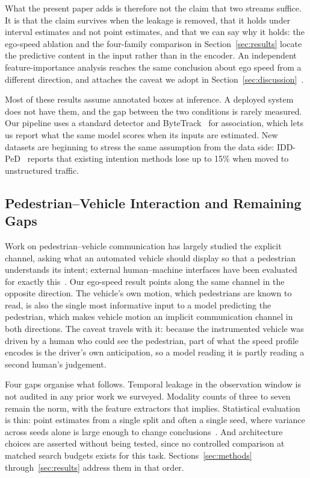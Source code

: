 \documentclass[mti,article,submit,moreauthors]{Definitions/mdpi}
\begin{document}
What the present paper adds is therefore not the claim that two streams suffice. It is that the claim survives when the leakage is removed, that it holds under interval estimates and not point estimates, and that we can say why it holds: the ego-speed ablation and the four-family comparison in Section~\ref{sec:results} locate the predictive content in the input rather than in the encoder. An independent feature-importance analysis reaches the same conclusion about ego speed from a different direction, and attaches the caveat we adopt in Section~\ref{sec:discussion}~\citep{azarmi2024featureimportance}.

Most of these results assume annotated boxes at inference. A deployed system does not have them, and the gap between the two conditions is rarely measured. Our pipeline uses a standard detector and ByteTrack~\citep{zhang2022bytetrack} for association, which lets us report what the same model scores when its inputs are estimated. New datasets are beginning to stress the same assumption from the data side: IDD-PeD~\citep{bokkasam2025iddped} reports that existing intention methods lose up to 15\% when moved to unstructured traffic.

\subsection{Pedestrian--Vehicle Interaction and Remaining Gaps}

Work on pedestrian--vehicle communication has largely studied the explicit channel, asking what an automated vehicle should display so that a pedestrian understands its intent; external human--machine interfaces have been evaluated for exactly this~\citep{rouchitsas2019ehmi,alhawiti2024ehmi}. Our ego-speed result points along the same channel in the opposite direction. The vehicle's own motion, which pedestrians are known to read, is also the single most informative input to a model predicting the pedestrian, which makes vehicle motion an implicit communication channel in both directions. The caveat travels with it: because the instrumented vehicle was driven by a human who could see the pedestrian, part of what the speed profile encodes is the driver's own anticipation, so a model reading it is partly reading a second human's judgement.

Four gaps organise what follows. Temporal leakage in the observation window is not audited in any prior work we surveyed. Modality counts of three to seven remain the norm, with the feature extractors that implies. Statistical evaluation is thin: point estimates from a single split and often a single seed, where variance across seeds alone is large enough to change conclusions~\citep{bouthillier2021variance}. And architecture choices are asserted without being tested, since no controlled comparison at matched search budgets exists for this task. Sections~\ref{sec:methods} through~\ref{sec:results} address them in that order.
\end{document}
